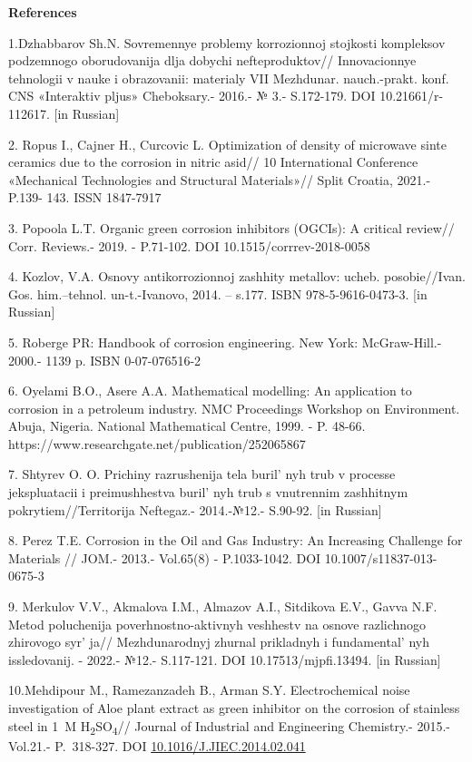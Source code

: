 \begin{center}
{\bfseries References}
\end{center}

\begin{noparindent}
1.Dzhabbarov Sh.N. Sovremennye problemy korrozionnoj stojkosti
kompleksov podzemnogo oborudovanija dlja dobychi nefteproduktov//
Innovacionnye tehnologii v nauke i obrazovanii: materialy VII Mezhdunar.
nauch.-prakt. konf. CNS «Interaktiv pljus» Cheboksary.- 2016.- № 3.-
S.172-179. DOI 10.21661/r-112617. {[}in Russian{]}

2. Ropus I., Cajner H., Curcovic L. Optimization of density of microwave
sinte ceramics due to the corrosion in nitric asid// 10 International
Conference «Mechanical Technologies and Structural Materials»// Split
Croatia, 2021.- P.139- 143. ISSN 1847-7917

3. Popoola L.T. Organic green corrosion inhibitors (OGCIs): A critical
review// Corr. Reviews.- 2019. - P.71-102. DOI 10.1515/corrrev-2018-0058

4. Kozlov, V.A. Osnovy antikorrozionnoj zashhity metallov: ucheb.
posobie//Ivan. Gos. him.--tehnol. un-t.-Ivanovo, 2014. -- s.177. ISBN
978-5-9616-0473-3. {[}in Russian{]}

5. Roberge PR: Handbook of corrosion engineering. New York:
McGraw-Hill.- 2000.- 1139 p. ISBN 0-07-076516-2

6. Oyelami B.O., Asere A.A. Mathematical modelling: An application to
corrosion in a petroleum industry. NMC Proceedings Workshop on
Environment. Abuja, Nigeria. National Mathematical Centre, 1999. - P.
48-66. https://www.researchgate.net/publication/252065867

7. Shtyrev O. O. Prichiny razrushenija tela buril' nyh
trub v processe jekspluatacii i preimushhestva buril' nyh
trub s vnutrennim zashhitnym pokrytiem//Territorija Neftegaz.-
2014.-№12.- S.90-92. {[}in Russian{]}

8. Perez T.E. Corrosion in the Oil and Gas Industry: An Increasing
Challenge for Materials // JOM.- 2013.- Vol.65(8) - P.1033-1042. DOI
10.1007/s11837-013-0675-3

9. Merkulov V.V., Akmalova I.M., Almazov A.I., Sitdikova E.V., Gavva
N.F. Metod poluchenija poverhnostno-aktivnyh veshhestv na osnove
razlichnogo zhirovogo syr' ja// Mezhdunarodnyj zhurnal
prikladnyh i fundamental' nyh issledovanij. - 2022.-
№12.- S.117-121. DOI 10.17513/mjpfi.13494. {[}in Russian{]}

10.Mehdipour M., Ramezanzadeh B., Arman S.Y. Electrochemical noise
investigation of Aloe plant extract as green inhibitor on the corrosion
of stainless steel in 1~M H\textsubscript{2}SO\textsubscript{4}//
Journal of Industrial and Engineering Chemistry.- 2015.-Vol.21.-
P.~318-327.
DOI \href{https://doi.org/10.1016/J.JIEC.2014.02.041}{10.1016/J.JIEC.2014.02.041}
\end{noparindent}

